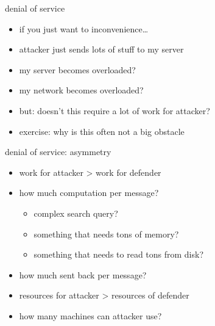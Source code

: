 \begin{frame}{denial of service}
    \begin{itemize}
    \item if you just want to inconvenience\ldots
    \item attacker just sends lots of stuff to my server
    \item my server becomes overloaded?
    \item my network becomes overloaded?
    \vspace{.5cm}
    \item but: doesn't this require a lot of work for attacker?
    \item exercise: why is this often not a big obstacle
    \end{itemize}
\end{frame}

\begin{frame}{denial of service: asymmetry}
    \begin{itemize}
    \item work for attacker > work for defender
    \item how much computation per message?
        \begin{itemize}
        \item complex search query?
        \item something that needs tons of memory?
        \item something that needs to read tons from disk?
        \end{itemize}
    \item how much sent back per message?
    \vspace{.5cm}
    \item resources for attacker > resources of defender
    \item how many machines can attacker use?
    \end{itemize}
\end{frame}

